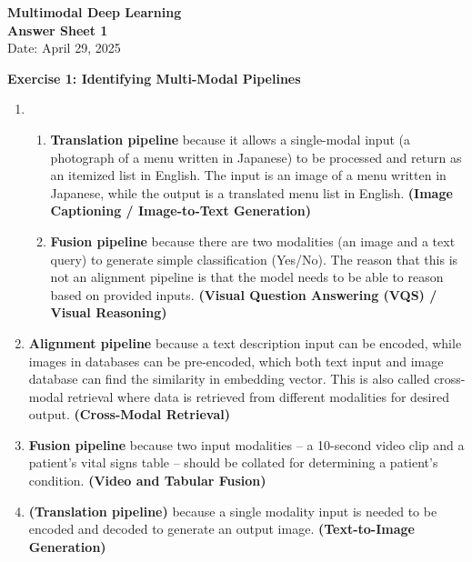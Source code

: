 \documentclass[11pt]{article}
\begin{document}
\begin{center}
    {\Large \textbf{Multimodal Deep Learning}} \\ [0.3em]
    \textbf{Answer Sheet 1} \\ [0.3em]
    Date: April 29, 2025
\end{center}

\vspace{1cm}

\noindent
\textbf{Exercise 1: Identifying Multi-Modal Pipelines}

\begin{enumerate}[label=(\alph*)]
    \item  {
    \begin{enumerate}[label=\arabic*.]
        \item \textbf{Translation pipeline} because it allows a single-modal input (a photograph of a menu written in Japanese) to be processed and return as an itemized list in English. 
        The input is an image of a menu written in Japanese, while the output is a translated menu list in English.
        \textbf{(Image Captioning / Image-to-Text Generation)}
        \item \textbf{Fusion pipeline} because there are two modalities (an image and a text query) to generate simple classification (Yes/No).
        The reason that this is not an alignment pipeline is that the model needs to be able to reason based on provided inputs.
        \textbf{(Visual Question Answering (VQS) / Visual Reasoning)}
    \end{enumerate}
    }

    \item \textbf{Alignment pipeline} because a text description input can be encoded, while images in databases can be pre-encoded, which both text input and image database can find the similarity in embedding vector.
    This is also called cross-modal retrieval where data is retrieved from different modalities for desired output.
    \textbf{(Cross-Modal Retrieval)}

    \item \textbf{Fusion pipeline} because two input modalities -- a 10-second video clip and a patient’s vital signs table -- should be collated for determining a patient's condition.
    \textbf{(Video and Tabular Fusion)}

    \item \textbf{(Translation pipeline)} because a single modality input is needed to be encoded and decoded to generate an output image.
    \textbf{(Text-to-Image Generation)}
\end{enumerate}
\end{document}
